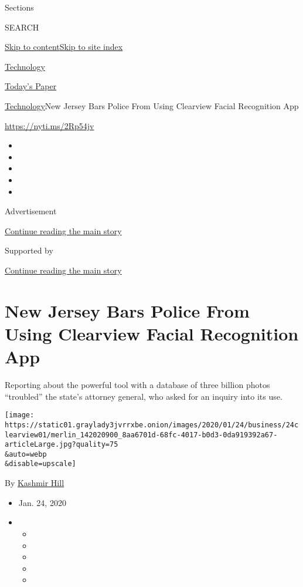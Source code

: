 Sections

SEARCH

\protect\hyperlink{site-content}{Skip to
content}\protect\hyperlink{site-index}{Skip to site index}

\href{https://www.nytimes3xbfgragh.onion/section/technology}{Technology}

\href{https://myaccount.nytimes3xbfgragh.onion/auth/login?response_type=cookie\&client_id=vi}{}

\href{https://www.nytimes3xbfgragh.onion/section/todayspaper}{Today's
Paper}

\href{/section/technology}{Technology}\textbar{}New Jersey Bars Police
From Using Clearview Facial Recognition App

\href{https://nyti.ms/2Rp54jv}{https://nyti.ms/2Rp54jv}

\begin{itemize}
\item
\item
\item
\item
\item
\end{itemize}

Advertisement

\protect\hyperlink{after-top}{Continue reading the main story}

Supported by

\protect\hyperlink{after-sponsor}{Continue reading the main story}

\hypertarget{new-jersey-bars-police-from-using-clearview-facial-recognition-app}{%
\section{New Jersey Bars Police From Using Clearview Facial Recognition
App}\label{new-jersey-bars-police-from-using-clearview-facial-recognition-app}}

Reporting about the powerful tool with a database of three billion
photos ``troubled'' the state's attorney general, who asked for an
inquiry into its use.

\texttt{[image: https://static01.graylady3jvrrxbe.onion/images/2020/01/24/business/24clearview01/merlin\_142020900\_8aa6701d-68fc-4017-b0d3-0da919392a67-articleLarge.jpg?quality=75\\\&auto=webp\\\&disable=upscale]}

By \href{https://www.nytimes3xbfgragh.onion/by/kashmir-hill}{Kashmir
Hill}

\begin{itemize}
\item
  Jan. 24, 2020
\item
  \begin{itemize}
  \item
  \item
  \item
  \item
  \item
  \end{itemize}
\end{itemize}

